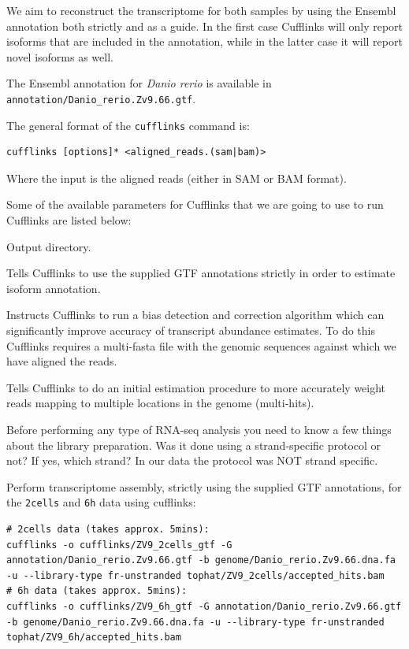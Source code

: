 We aim to reconstruct the transcriptome for both samples by using the Ensembl
annotation both strictly and as a guide. In the first case Cufflinks will only
report isoforms that are included in the annotation, while in the latter case
it will report novel isoforms as well.

The Ensembl annotation for \textit{Danio rerio} is available in
\texttt{annotation/Danio\_rerio.Zv9.66.gtf}.

\begin{information}
The general format of the \texttt{cufflinks} command is:
\begin{lstlisting}[style=command_syntax]
cufflinks [options]* <aligned_reads.(sam|bam)>
\end{lstlisting}
Where the input is the aligned reads (either in SAM or BAM format).
\end{information}

\begin{note}
Some of the available parameters for Cufflinks that we are going to use to run
Cufflinks are listed below:
\begin{description}[style=multiline,labelindent=0cm,align=right,leftmargin=\descriptionlabelspace,rightmargin=1.5cm,font=\ttfamily]
  \item[-o] Output directory.
  \item[-G] Tells Cufflinks to use the supplied GTF annotations strictly in order
  to estimate isoform annotation.
  \item[-b] Instructs Cufflinks to run a bias detection and correction algorithm
  which can significantly improve accuracy of transcript abundance estimates.
  To do this Cufflinks requires a multi-fasta file with the genomic sequences
  against which we have aligned the reads.
  \item[-u] Tells Cufflinks to do an initial estimation procedure to more
  accurately weight reads mapping to multiple locations in the genome
  (multi-hits).
  \item[--library-type] Before performing any type of RNA-seq analysis you need
  to know a few things about the library preparation. Was it done using a
  strand-specific protocol or not? If yes, which strand? In our data the protocol
  was NOT strand specific.
\end{description}
\end{note}

\begin{steps}
Perform transcriptome assembly, strictly using the supplied GTF annotations, for the \texttt{2cells} and \texttt{6h} data using cufflinks:
\begin{lstlisting}
# 2cells data (takes approx. 5mins):
cufflinks -o cufflinks/ZV9_2cells_gtf -G annotation/Danio_rerio.Zv9.66.gtf -b genome/Danio_rerio.Zv9.66.dna.fa -u --library-type fr-unstranded tophat/ZV9_2cells/accepted_hits.bam
# 6h data (takes approx. 5mins):
cufflinks -o cufflinks/ZV9_6h_gtf -G annotation/Danio_rerio.Zv9.66.gtf -b genome/Danio_rerio.Zv9.66.dna.fa -u --library-type fr-unstranded tophat/ZV9_6h/accepted_hits.bam
\end{lstlisting}
\end{steps}

